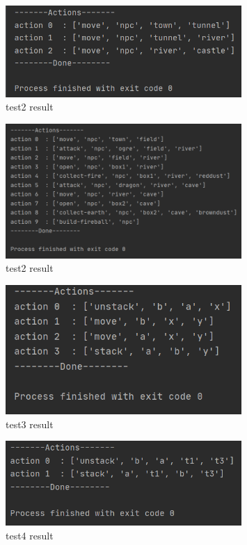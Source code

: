 \documentclass[a4paper, 11pt]{article}
\begin{document}
\begin{enumerate}
	\begin{figure}[H]
	\centering
	\includegraphics[width=0.8\textwidth]{Pic/test1.png}
	\caption{test2 result}
	\end{figure}
	

	\begin{figure}[H]
	\centering
	\includegraphics[width=0.8\textwidth]{Pic/test2.png}
	\caption{test2 result}
	\end{figure}
	

	\begin{figure}[H]
	\centering
	\includegraphics[width=0.8\textwidth]{Pic/test3.png}
	\caption{test3 result}
	\end{figure}
	

	\begin{figure}[H]
	\centering
	\includegraphics[width=0.8\textwidth]{Pic/test4.png}
	\caption{test4 result}
	\end{figure}
\end{enumerate}
\end{document}
